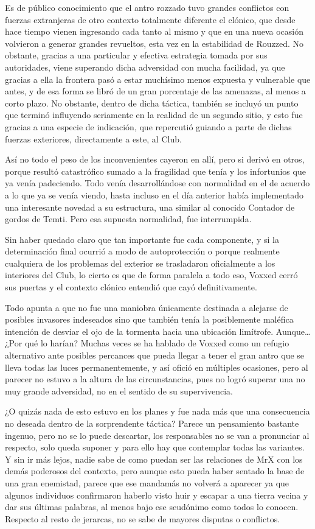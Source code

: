 \documentclass[
  spanish,
]{book}
\begin{document}
Es de público conocimiento que el antro rozzado tuvo grandes conflictos con fuerzas extranjeras de otro contexto totalmente diferente el clónico, que desde hace tiempo vienen ingresando cada tanto al mismo y que en una nueva ocasión volvieron a generar grandes revueltos, esta vez en la estabilidad de Rouzzed. No obstante, gracias a una particular y efectiva estrategia tomada por sus autoridades, viene superando dicha adversidad con mucha facilidad, ya que gracias a ella la frontera pasó a estar muchísimo menos expuesta y vulnerable que antes, y de esa forma se libró de un gran porcentaje de las amenazas, al menos a corto plazo.
No obstante, dentro de dicha táctica, también se incluyó un punto que terminó influyendo seriamente en la realidad de un segundo sitio, y esto fue gracias a una especie de indicación, que repercutió guiando a parte de dichas fuerzas exteriores, directamente a este, al Club.

Así no todo el peso de los inconvenientes cayeron en allí, pero si derivó en otros, porque resultó catastrófico sumado a la fragilidad que tenía y los infortunios que ya venía padeciendo. Todo venía desarrollándose con normalidad en el de acuerdo a lo que ya se venía viendo, hasta incluso en el día anterior había implementado una interesante novedad a su estructura, una similar al conocido Contador de gordos de Temti. Pero esa supuesta normalidad, fue interrumpida.

Sin haber quedado claro que tan importante fue cada componente, y si la determinación final ocurrió a modo de autoprotección o porque realmente cualquiera de los problemas del exterior se trasladaron oficialmente a los interiores del Club, lo cierto es que de forma paralela a todo eso, Voxxed cerró sus puertas y el contexto clónico entendió que cayó definitivamente.

Todo apunta a que no fue una maniobra únicamente destinada a alejarse de posibles invasores indeseados sino que también tenía la posiblemente maléfica intención de desviar el ojo de la tormenta hacia una ubicación limítrofe. Aunque\ldots{} ¿Por qué lo harían?
Muchas veces se ha hablado de Voxxed como un refugio alternativo ante posibles percances que pueda llegar a tener el gran antro que se lleva todas las luces permanentemente, y así ofició en múltiples ocasiones, pero al parecer no estuvo a la altura de las circunstancias, pues no logró superar una no muy grande adversidad, no en el sentido de su supervivencia.

¿O quizás nada de esto estuvo en los planes y fue nada más que una consecuencia no deseada dentro de la sorprendente táctica?
Parece un pensamiento bastante ingenuo, pero no se lo puede descartar, los responsables no se van a pronunciar al respecto, solo queda suponer y para ello hay que contemplar todas las variantes.
Y sin ir más lejos, nadie sabe de como puedan ser las relaciones de MrX con los demás poderosos del contexto, pero aunque esto pueda haber sentado la base de una gran enemistad, parece que ese mandamás no volverá a aparecer ya que algunos individuos confirmaron haberlo visto huir y escapar a una tierra vecina y dar sus últimas palabras, al menos bajo ese seudónimo como todos lo conocen. Respecto al resto de jerarcas, no se sabe de mayores disputas o conflictos.
\end{document}
